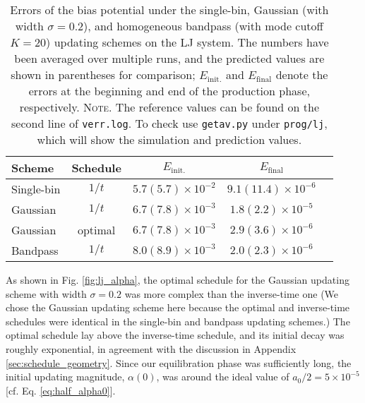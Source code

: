 \documentclass[reprint, superscriptaddress, floatfix]{revtex4-1}
\newcommand{\note}[1]{{\color{DarkGreen}\footnotesize \textsc{Note.} #1}}
\newcommand{\Err}{E}
\begin{document}
\begin{table}[h]
  \caption{\label{tab:lj_error}
    Errors of the bias potential under
    the single-bin,
    Gaussian (with width $\sigma = 0.2$),
    and homogeneous bandpass (with mode cutoff $K = 20$)
    updating schemes
    on the LJ system.
    The numbers have been averaged over multiple runs,
    and the predicted values are shown in parentheses for comparison;
    $\Err_\mathrm{init.}$ and $\Err_\mathrm{final}$
    denote the errors at the beginning and end of the production phase, respectively.
    \note{The reference values can be found
    on the second line of \texttt{verr.log}.
    To check use \texttt{getav.py} under \texttt{prog/lj},
    which will show the simulation and prediction values.}%
  }
  \setlength{\tabcolsep}{2pt}
  \renewcommand\arraystretch{1.4}
  \begin{tabular} { l c c c c }
    \hline
    Scheme & Schedule &
    $\Err_\mathrm{init.}$ &
    $\Err_\mathrm{final}$
    \\
    \hline
    Single-bin & $1/t$
    & $5.7(5.7)\times10^{-2}$
    & $9.1(11.4)\times10^{-6}$
    \\
    Gaussian & $1/t$
    & $6.7(7.8)\times10^{-3}$
    & $1.8(2.2)\times10^{-5}$
    \\
    Gaussian & optimal
    & $6.7(7.8)\times10^{-3}$
    & $2.9(3.6)\times10^{-6}$
    \\
    Bandpass & $1/t$
    & $8.0(8.9)\times10^{-3}$
    & $2.0(2.3)\times10^{-6}$
    \\
    \hline
  \end{tabular}
\end{table}

As shown in Fig. \ref{fig:lj_alpha},
the optimal schedule for the Gaussian updating scheme
with width $\sigma = 0.2$
was more complex than the inverse-time one
(We chose the Gaussian updating scheme here because
the optimal and inverse-time schedules were identical
in the single-bin and bandpass updating schemes.)
%
The optimal schedule lay above the inverse-time schedule,
and its initial decay was roughly exponential,
in agreement with the discussion in Appendix \ref{sec:schedule_geometry}.
%
Since our equilibration phase was sufficiently long,
the initial updating magnitude, $\alpha(0)$,
was around the ideal value of $a_0/2 = 5\times10^{-5}$
[cf. Eq. \eqref{eq:half_alpha0}].
\end{document}
